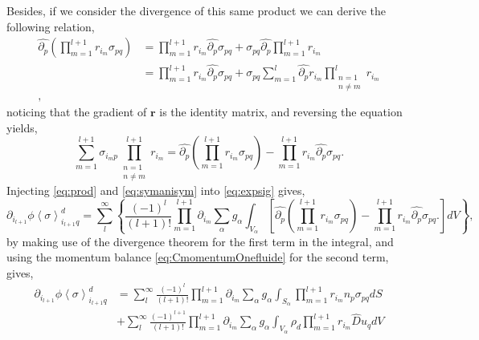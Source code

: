 {Besides, if we consider the divergence of this same product we can derive the following relation,
\begin{align*}
    \hat{\partial_p} \left(\prod^{l+1}_{m=1} r_{i_m} \sigma_{pq}\right)
    &= \prod^{l+1}_{m=1} r_{i_m} \hat{\partial_p} \sigma_{pq}
    + \sigma_{pq} \hat{\partial_p} \prod^{l+1}_{m=1} r_{i_m}\\
    &= \prod^{l+1}_{m=1} r_{i_m} \hat{\partial_p} \sigma_{pq}
    + \sigma_{pq}  \sum_{m=1}^l \hat{\partial_p}  r_{i_m}  \prod^{l}_{\substack{n=1 \\ n \neq m}} r_{i_m}\\,
\end{align*}
noticing that the gradient of $\bm{r}$ is the identity matrix, and reversing the equation yields,
\begin{equation}
    \sum_{m=1}^{l+1} \sigma_{i_mp}  \prod^{l+1}_{\substack{n=1 \\ n \neq m}} r_{i_m}
    =\hat{\partial_p} \left(\prod^{l+1}_{m=1} r_{i_m} \sigma_{pq}\right)
    - \prod^{l+1}_{m=1} r_{i_m} \hat{\partial_p} \sigma_{pq}.
    \label{eq:prod}
\end{equation}
Injecting \ref{eq:prod} and \ref{eq:symanisym} into \ref{eq:expsig} gives,
\begin{equation*}
    \partial_{i_{l+1}}
    \phi\left<\sigma\right>_{i_{l+1}q}^d=
    \sum_l^\infty
    \left\{
        \frac{(-1)^{l}}{(l+1)!}
        \prod^{l+1}_{m=1}
        \partial_{i_m}
        \sum_{\alpha}
        g_{\alpha}
        \int_{V_\alpha}
        \left[
            \hat{\partial_p} \left(\prod^{l+1}_{m=1} r_{i_m} \sigma_{pq}\right)
            - \prod^{l+1}_{m=1} r_{i_m} \hat{\partial_p} \sigma_{pq}.
        \right]
        dV
    \right\},
\end{equation*}
by making use of the divergence theorem for the first term in the integral, and using the momentum balance \ref{eq:CmomentumOnefluide} for the second term,  gives,
\begin{align}
    \label{eq:S}
    \partial_{i_{l+1}}
    \phi\left<\sigma\right>_{i_{l+1}q}^d
    &=
    \sum_l^\infty
    \frac{(-1)^{l}}{(l+1)!}
    \prod^{l+1}_{m=1}
    \partial_{i_m}
    \sum_{\alpha}
    g_{\alpha}
    \int_{S_\alpha}
    \prod^{l+1}_{m=1} r_{i_m} n_p \sigma_{pq}
    dS\\
    \label{eq:Dt}
    &+\sum_l^\infty
    \frac{(-1)^{l+1}}{(l+1)!}
    \prod^{l+1}_{m=1}
    \partial_{i_m}
    \sum_{\alpha}
    g_{\alpha}
    \int_{V_\alpha}
    \rho_d
    \prod^{l+1}_{m=1} r_{i_m} 
    \hat{D}u_q
    dV \\  

\end{align}}

